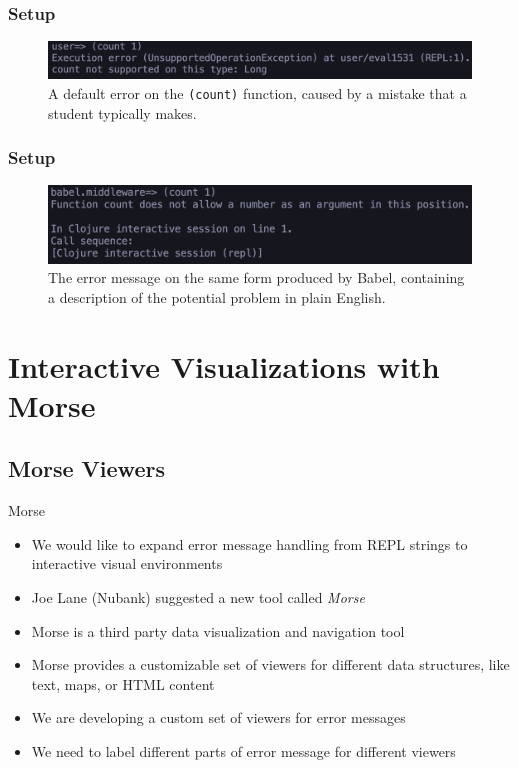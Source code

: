 \documentclass{beamer}
\begin{document}
\begin{frame}
    \frametitle{Setup}
    \begin{figure}
        \centering
        \includegraphics[width=\textwidth]{../resources/CountError.png}
        \caption{A default error on the \texttt{(count)} function, caused by a mistake that a student typically makes.}
        \label{fig:countError}
    \end{figure}
\end{frame}

\begin{frame}
    \frametitle{Setup}
    \begin{figure}
        \centering
        \includegraphics[width=\textwidth]{../resources/CountBabelError.png}
        \caption{The error message on the same form produced by Babel, containing a description of the potential problem in plain English.}
        \label{fig:BabelCountError}
    \end{figure}
\end{frame}

\section{Interactive Visualizations with Morse}

\subsection{Morse Viewers}

\begin{frame}{Morse}
  \begin{itemize}
    \item<1-> We would like to expand error message handling from REPL strings to interactive visual environments
    \item<2-> Joe Lane (Nubank) suggested a new tool called \textit{Morse} 
    \item<3-> Morse is a third party data visualization and navigation tool
    \item<4-> Morse provides a customizable set of viewers for different data structures, like text, maps, or HTML content
    \item<5-> We are developing a custom set of viewers for error messages
    \item<6-> We need to label different parts of error message for different viewers
  \end{itemize}
\end{frame}
\end{document}
